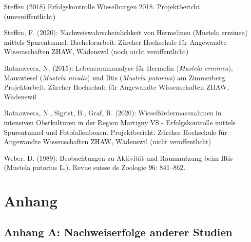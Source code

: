 \documentclass[
  oneside]{scrbook}
\begin{document}
Steffen (2018) Erfolgskontrolle Wieselburgen 2018. Projektbericht (unveröffentlicht)

Steffen, F. (2020): Nachweiswahrscheinlichkeit von Hermelinen (Mustela erminea) mittels Spurentunnel. Bachelorarbeit. Zürcher Hochschule für Angewandte Wissenschaften ZHAW, Wädenswil (noch nicht veröffentlicht)

Ratnaweera, N. (2015): Lebensraumanalyse für Hermelin (\emph{Mustela erminea}), Mauswiesel (\emph{Mustela nivalis}) und Iltis (\emph{Mustela putorius}) am Zimmerberg. Projektarbeit. Zürcher Hochschule für Angewandte Wissenschaften ZHAW, Wädenswil

Ratnaweera, N., Sigrist, B., Graf, R. (2020): Wieselfördermassnahmen in intensiven Obstkulturen in der Region Martigny VS - Erfolgskontrolle mittels Spurentunnel und Fotofallenboxen. Projektbericht. Zürcher Hochschule für Angewandte Wissenschaften ZHAW, Wädenswil (nicht veröffentlicht)

Weber, D. (1989): Beobachtungen zu Aktivität und Raumnutzung beim Iltis (Mustela putorius L.). Revue suisse de Zoologie 96: 841--862.

\hypertarget{anhang}{%
\chapter{Anhang}\label{anhang}}

\hypertarget{anhang-zusammenstellung}{%
\section{Anhang A: Nachweiserfolge anderer Studien}\label{anhang-zusammenstellung}}
\end{document}
